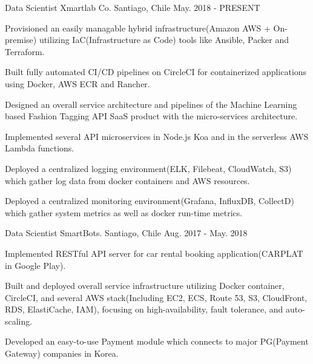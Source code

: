 

\begin{cventries}

  \cventry
    {Data Scientist} %
    {Xmartlab Co.} %
    {Santiago, Chile} %
    {May. 2018 - PRESENT} %
    {
      \begin{cvitems} %
        \item {Provisioned an easily managable hybrid infrastructure(Amazon AWS + On-premise) utilizing IaC(Infrastructure as Code) tools like Ansible, Packer and Terraform.}
        \item {Built fully automated CI/CD pipelines on CircleCI for containerized applications using Docker, AWS ECR and Rancher.}
        \item {Designed an overall service architecture and pipelines of the Machine Learning based Fashion Tagging API SaaS product with the micro-services architecture.}
        \item {Implemented several API microservices in Node.js Koa and in the serverless AWS Lambda functions.}
        \item {Deployed a centralized logging environment(ELK, Filebeat, CloudWatch, S3) which gather log data from docker containers and AWS resources.}
        \item {Deployed a centralized monitoring environment(Grafana, InfluxDB, CollectD) which gather system metrics as well as docker run-time metrics.}
      \end{cvitems}
    }

  \cventry
    {Data Scientist} %
    {SmartBots.} %
    {Santiago, Chile} %
    {Aug. 2017 - May. 2018} %
    {
      \begin{cvitems} %
        \item {Implemented RESTful API server for car rental booking application(CARPLAT in Google Play).}
        \item {Built and deployed overall service infrastructure utilizing Docker container, CircleCI, and several AWS stack(Including EC2, ECS, Route 53, S3, CloudFront, RDS, ElastiCache, IAM), focusing on high-availability, fault tolerance, and auto-scaling.}
        \item {Developed an easy-to-use Payment module which connects to major PG(Payment Gateway) companies in Korea.}
      \end{cvitems}
    }


\end{cventries}
